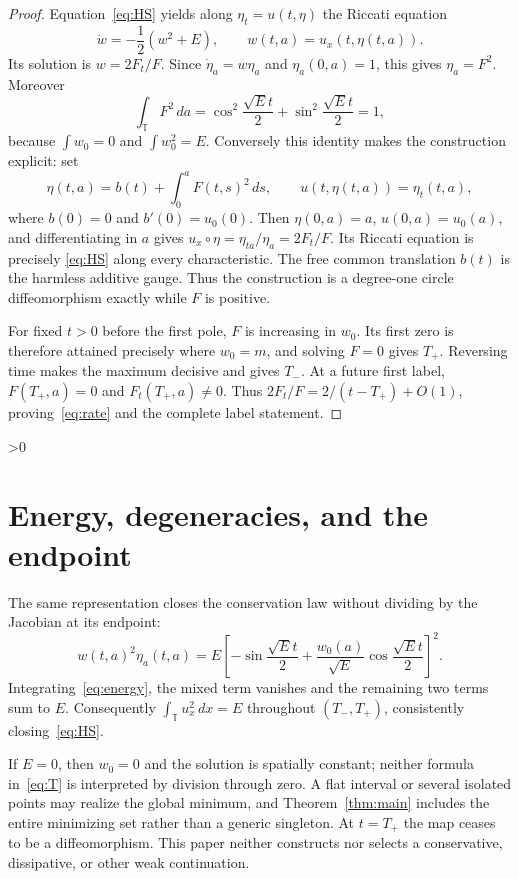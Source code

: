 \documentclass[10pt]{article}
\providecommand{\CRevisionRound}{2}
\newcommand{\TT}{\mathbb T}
\begin{document}
\begin{proof}
Equation~\eqref{eq:HS} yields along $\eta_t=u(t,\eta)$ the Riccati equation
\[
 \dot w=-\frac12(w^2+E),\qquad w(t,a)=u_x(t,\eta(t,a)).
\]
Its solution is $w=2F_t/F$.  Since $\dot\eta_a=w\eta_a$ and
$\eta_a(0,a)=1$, this gives $\eta_a=F^2$.  Moreover
\[
 \int_{\TT}F^2\,da=\cos^2\frac{\sqrt Et}{2}
 +\sin^2\frac{\sqrt Et}{2}=1,
\]
because $\int w_0=0$ and $\int w_0^2=E$.  Conversely this identity makes
the construction explicit: set
\[
 \eta(t,a)=b(t)+\int_0^aF(t,s)^2\,ds,
 \qquad u(t,\eta(t,a))=\eta_t(t,a),
\]
where $b(0)=0$ and $b'(0)=u_0(0)$.  Then $\eta(0,a)=a$,
$u(0,a)=u_0(a)$, and differentiating in $a$ gives
$u_x\circ\eta=\eta_{ta}/\eta_a=2F_t/F$.  Its Riccati equation is precisely
\eqref{eq:HS} along every characteristic.  The free common translation
$b(t)$ is the harmless additive gauge.  Thus the construction is a
degree-one circle diffeomorphism exactly while $F$ is positive.

For fixed $t>0$ before the first pole, $F$ is increasing in $w_0$.
Its first zero is therefore attained precisely where $w_0=m$, and solving
$F=0$ gives $T_+$.  Reversing time makes the maximum decisive and gives
$T_-$.  At a future first label, $F(T_+,a)=0$ and $F_t(T_+,a)\ne0$.
Thus $2F_t/F=2/(t-T_+)+O(1)$, proving~\eqref{eq:rate} and the complete
label statement.
\end{proof}

\ifnum\CRevisionRound>0
\section{Energy, degeneracies, and the endpoint}
The same representation closes the conservation law without dividing by
the Jacobian at its endpoint:
\begin{equation}\label{eq:energy}
 w(t,a)^2\eta_a(t,a)=E\left[-\sin\frac{\sqrt Et}{2}
 +\frac{w_0(a)}{\sqrt E}\cos\frac{\sqrt Et}{2}\right]^2.
\end{equation}
Integrating~\eqref{eq:energy}, the mixed term vanishes and the remaining
two terms sum to $E$.  Consequently $\int_{\TT}u_x^2\,dx=E$ throughout
$(T_-,T_+)$, consistently closing~\eqref{eq:HS}.

If $E=0$, then $w_0=0$ and the solution is spatially constant; neither
formula in~\eqref{eq:T} is interpreted by division through zero.  A flat
interval or several isolated points may realize the global minimum, and
Theorem~\ref{thm:main} includes the entire minimizing set rather than a
generic singleton.  At $t=T_+$ the map ceases to be a diffeomorphism.
This paper neither constructs nor selects a conservative, dissipative, or
other weak continuation.
\fi
\end{document}
